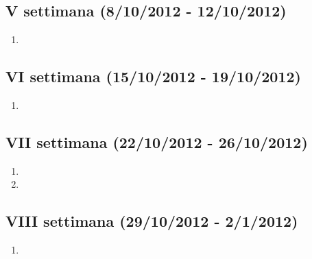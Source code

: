\documentclass[10pt,a4paper,hidelinks]{scrartcl} %
\begin{document}
	\subsection*{V settimana (8/10/2012 - 12/10/2012)}
	\begin{enumerate}
	\item {}
	\end{enumerate}	
	\subsection*{VI settimana (15/10/2012 - 19/10/2012)}
	\begin{enumerate}
	\item {}
	\end{enumerate}
	\subsection*{VII settimana (22/10/2012 - 26/10/2012)}
	\begin{enumerate}
	\item {}
	\item {}
	\end{enumerate}
	\subsection*{VIII settimana (29/10/2012 - 2/1/2012)}
	\begin{enumerate}
	\item {}
	\end{enumerate}

\end{document}

